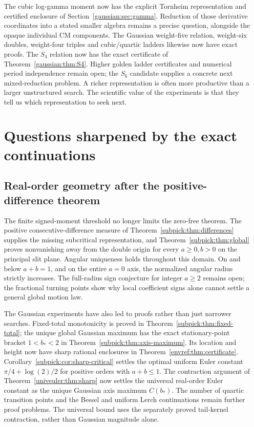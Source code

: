 The cubic log-gamma moment now has the explicit Tornheim representation
and certified enclosure of Section~\ref{gaussian:sec:gamma}. Reduction of
those derivative coordinates into a stated smaller algebra remains a precise
question, alongside the opaque individual CM components. The Gaussian
weight-five relation, weight-six doubles, weight-four triples and cubic/quartic
ladders likewise now have exact proofs. The $S_4$ relation now has the exact certificate of
Theorem~\ref{gaussian:thm:S4}. Higher golden ladder certificates and
numerical period independence remain open; the $S_6$ candidate supplies
a concrete next mixed-reduction problem. A richer representation is often more productive than a
larger unstructured search. The scientific value of the experiments is
that they tell us which representation to seek next.

\section{Questions sharpened by the exact continuations}
\subsection{Real-order geometry after the positive-difference theorem}
The finite signed-moment threshold no longer limits the zero-free theorem.
The positive consecutive-difference measure of
Theorem~\ref{subpick:thm:differences} supplies the missing subcritical
representation, and Theorem~\ref{subpick:thm:global} proves nonvanishing
away from the double origin for every $a\ge0,b>0$ on the principal slit
plane. Angular uniqueness holds throughout this domain. On and below
$a+b=1$, and on the entire $a=0$ axis, the normalized angular radius
strictly increases. The full-radius sign conjecture for integer $a\ge2$
remains open; the fractional turning points show why local coefficient
signs alone cannot settle a general global motion law.

The Gaussian experiments have also led to proofs rather than just narrower
searches. Fixed-total monotonicity is proved in
Theorem~\ref{subpick:thm:fixed-total}; the unique global Gaussian maximum
has the exact stationary-point bracket $1<b_*<2$ in
Theorem~\ref{subpick:thm:axis-maximum}. Its location and height now have
sharp rational enclosures in Theorem~\ref{envref:thm:certificate}.
Corollary~\ref{subpick:cor:sharp-critical} settles the optimal
uniform Euler constant $\pi/4+\log(2)/2$ for positive orders with
$a+b\le1$. The contraction argument of
Theorem~\ref{univeuler:thm:sharp} now settles the universal real-order
Euler constant as the unique Gaussian axis maximum $C(b_*)$.
The number of quartic transition points and the Bessel and uniform Lerch
continuations remain further proof problems. The universal bound uses
the separately proved tail-kernel contraction, rather than Gaussian
magnitude alone.

